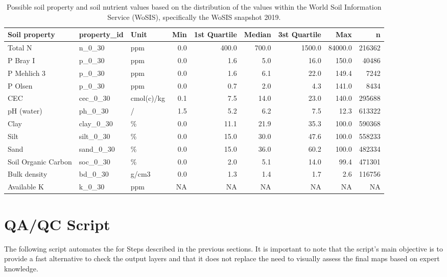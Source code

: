\documentclass[
  10pt,
  b5paper,
  oneside]{book}
\begin{document}
\begin{table}

\caption{\label{tab:ranges}\label{tab:ranges}Possible soil property and soil nutrient values based on the distribution of the values within the World Soil Information Service (WoSIS), specifically the WoSIS snapshot 2019.}
\centering
\fontsize{7}{9}\selectfont
\begin{tabular}[t]{lllrrrrrr}
\toprule
Soil property & property\_id & Unit & Min & 1st Quartile & Median & 3st Quartile & Max & n\\
\midrule
Total N & n\_0\_30 & ppm & 0.0 & 400.0 & 700.0 & 1500.0 & 84000.0 & 216362\\
P Bray I & p\_0\_30 & ppm & 0.0 & 1.6 & 5.0 & 16.0 & 150.0 & 40486\\
P Mehlich 3 & p\_0\_30 & ppm & 0.0 & 1.6 & 6.1 & 22.0 & 149.4 & 7242\\
P Olsen & p\_0\_30 & ppm & 0.0 & 0.7 & 2.0 & 4.3 & 141.0 & 8434\\
CEC & cec\_0\_30 & cmol(c)/kg & 0.1 & 7.5 & 14.0 & 23.0 & 140.0 & 295688\\
\addlinespace
pH (water) & ph\_0\_30 & / & 1.5 & 5.2 & 6.2 & 7.5 & 12.3 & 613322\\
Clay & clay\_0\_30 & \% & 0.0 & 11.1 & 21.9 & 35.3 & 100.0 & 590368\\
Silt & silt\_0\_30 & \% & 0.0 & 15.0 & 30.0 & 47.6 & 100.0 & 558233\\
Sand & sand\_0\_30 & \% & 0.0 & 15.0 & 36.0 & 60.2 & 100.0 & 482334\\
Soil Organic Carbon & soc\_0\_30 & \% & 0.0 & 2.0 & 5.1 & 14.0 & 99.4 & 471301\\
\addlinespace
Bulk density & bd\_0\_30 & g/cm3 & 0.0 & 1.3 & 1.4 & 1.7 & 2.6 & 116756\\
Available K & k\_0\_30 & ppm & NA & NA & NA & NA & NA & NA\\
\bottomrule
\end{tabular}
\end{table}

\hypertarget{qaqc-script}{%
\section*{QA/QC Script}\label{qaqc-script}}

The following script automates the for Steps described in the previous sections. It is important to note that the script's main objective is to provide a fast alternative to check the output layers and that it does not replace the need to visually assess the final maps based on expert knowledge.
\end{document}
